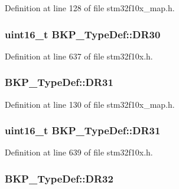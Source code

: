 Definition at line 128 of file stm32f10x\+\_\+map.\+h.

\subsubsection[{\texorpdfstring{D\+R30}{DR30}}]{ {\bf uint16\+\_\+t} B\+K\+P\+\_\+\+Type\+Def\+::\+D\+R30}\hypertarget{struct_b_k_p___type_def_a7413138b9d21280f51975d9f80c66826}{}\label{struct_b_k_p___type_def_a7413138b9d21280f51975d9f80c66826}


Definition at line 637 of file stm32f10x.\+h.

\subsubsection[{\texorpdfstring{D\+R31}{DR31}}]{ B\+K\+P\+\_\+\+Type\+Def\+::\+D\+R31}\hypertarget{struct_b_k_p___type_def_a7c2d12a8efde82477030347252a39f36}{}\label{struct_b_k_p___type_def_a7c2d12a8efde82477030347252a39f36}


Definition at line 130 of file stm32f10x\+\_\+map.\+h.

\subsubsection[{\texorpdfstring{D\+R31}{DR31}}]{ {\bf uint16\+\_\+t} B\+K\+P\+\_\+\+Type\+Def\+::\+D\+R31}\hypertarget{struct_b_k_p___type_def_a59e675eaee3b1035123bc6d21a19e153}{}\label{struct_b_k_p___type_def_a59e675eaee3b1035123bc6d21a19e153}


Definition at line 639 of file stm32f10x.\+h.

\subsubsection[{\texorpdfstring{D\+R32}{DR32}}]{ B\+K\+P\+\_\+\+Type\+Def\+::\+D\+R32}\hypertarget{struct_b_k_p___type_def_a8acbd92789de8890dce0afb122c9aa61}{}\label{struct_b_k_p___type_def_a8acbd92789de8890dce0afb122c9aa61}


